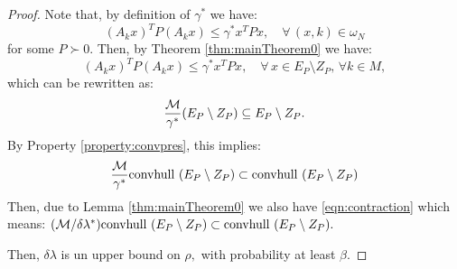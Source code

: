 \begin{proof}Note that, by definition of $\gamma^*$ we have:
\begin{equation*} (A_k x)^TP(A_k x) \leq \gamma^* x^TPx, \quad \forall\, (x,k)  \in \omega_N \end{equation*}
for some $P \succ 0$. Then, by Theorem \ref{thm:mainTheorem0} we have:
\begin{equation*} (A_k x)^TP(A_k x) \leq \gamma^*x^TPx, \quad \forall\, x \in E_P \setminus Z_P,\, \forall k \in M, \end{equation*}
which can be rewritten as:
\begin{equation*}\frac{\mathcal{M}}{\gamma^*}(E_P \setminus Z_P) \subseteq E_P \setminus Z_P.
\end{equation*}
By Property \ref{property:convpres}, this implies:
$$\frac{\mathcal{M}}{\gamma^*} \mbox{convhull }(E_P \setminus Z_P) \subset \mbox{convhull }(E_P \setminus Z_P)$$
Then, due to Lemma \ref{thm:mainTheorem0} we also have \eqref{eqn:contraction} which means:
$(\mathcal{M}/\delta \lambda^*) \mbox{convhull } (E_P \setminus Z_P) \subset \mbox{convhull } (E_P\setminus Z_P).$

Then, $\delta\lambda$ is un upper bound on $\rho,$ with probability at least $\beta$. 
\end{proof}
